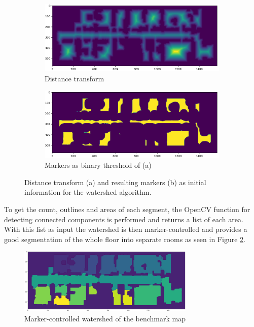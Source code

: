 \begin{figure}[h]
    \captionsetup[subfigure]{justification=centering}
    \centering
    \begin{subfigure}{.5\textwidth}
      \centering
      \includegraphics[width=\textwidth]{figures/50_implementation/ryu_distance_transform.png}
      \caption{Distance transform}
    \end{subfigure}%
    \begin{subfigure}{.5\textwidth}
      \centering
      \includegraphics[width=\textwidth]{figures/50_implementation/ryu_markers.png}
      \caption{Markers as binary threshold of (a)}
    \end{subfigure}
    \caption[Distance transform and resulting markers]{Distance transform (a) and resulting markers (b) as initial information for the watershed algorithm.}
    \label{fig:distance_transform}
\end{figure}

To get the count, outlines and areas of each segment, the OpenCV function for detecting connected components is performed and returns a list of each area. With this list as input the watershed is then marker-controlled and provides a good segmentation of the whole floor into separate rooms as seen in Figure \ref{fig:watershed}.

\begin{figure}[h]
    \centering
    \includegraphics[width=0.75\textwidth]{figures/50_implementation/ryu_watershed.png}
    \caption[Marker-controlled watershed of the benchmark map]{Marker-controlled watershed of the benchmark map}
    \label{fig:watershed}
\end{figure}

